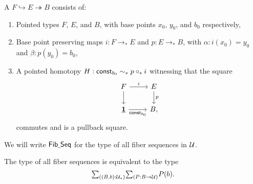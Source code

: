 \begin{defn}
A  $F\hookrightarrow E \twoheadrightarrow B$ consists of:
\begin{enumerate}
\item Pointed types $F$, $E$, and $B$, with base points $x_0$, $y_0$, and $b_0$ respectively, 
\item Base point preserving maps $i:F\to_\ast E$ and $p:E\to_\ast B$, with $\alpha:i(x_0)=y_0$ and $\beta:p(y_0)=b_0$,
\item A pointed homotopy $H:\mathsf{const}_{b_0}\sim_\ast p\circ_\ast i$ witnessing that the square
\begin{equation*}
\begin{tikzcd}
F \arrow[r,"i"] \arrow[d] & E \arrow[d,"p"] \\
\unit \arrow[r,swap,"\mathsf{const}_{b_0}"] & B,
\end{tikzcd}
\end{equation*}
commutes and is a pullback square.
\end{enumerate}
We will write $\mathsf{Fib\underline{\ }{}Seq}$ for the type of all fiber sequences in $\mathcal{U}$.
\end{defn}

\begin{thm}
The type of all fiber sequences is equivalent to the type
\begin{equation*}
\sm{(B,b):\UU_\ast}{P:B\to\UU}P(b).
\end{equation*}
\end{thm}
